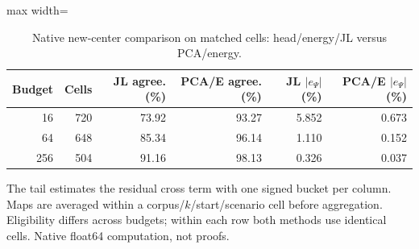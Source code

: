 \begin{table}[tp]
\caption{Native new-center comparison on matched cells: head/energy/JL versus PCA/energy.}\label{tab:reuse-jl}
\centering\small
\begin{adjustbox}{max width=\textwidth}
\begin{tabular}{@{}rrrrrr@{}}
\toprule
Budget & Cells & JL agree. (\%) & PCA/E agree. (\%) & JL $|e_\Psi|$ (\%) & PCA/E $|e_\Psi|$ (\%) \\
\midrule
16 & 720 & 73.92 & 93.27 & 5.852 & 0.673 \\
64 & 648 & 85.34 & 96.14 & 1.110 & 0.152 \\
256 & 504 & 91.16 & 98.13 & 0.326 & 0.037 \\
\bottomrule
\end{tabular}
\end{adjustbox}
\par\smallskip\begin{minipage}{0.98\textwidth}\footnotesize The tail estimates the residual cross term with one signed bucket per column. Maps are averaged within a corpus/$k$/start/scenario cell before aggregation. Eligibility differs across budgets; within each row both methods use identical cells. Native float64 computation, not proofs.\end{minipage}
\end{table}
